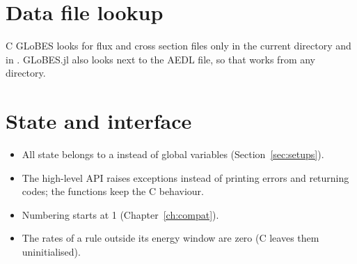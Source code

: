 \section{Data file lookup}

C GLoBES looks for flux and cross section files only in the current directory
and in . GLoBES.jl also looks next to the AEDL file, so that
 works from any directory.

\section{State and interface}

\begin{itemize}
\item All state belongs to a  instead of global variables
  (Section~\ref{sec:setups}).
\item The high-level API raises exceptions instead of printing errors and
  returning codes; the  functions keep the C behaviour.
\item Numbering starts at 1 (Chapter~\ref{ch:compat}).
\item The rates of a rule outside its energy window are zero (C leaves them
  uninitialised).
\end{itemize}

